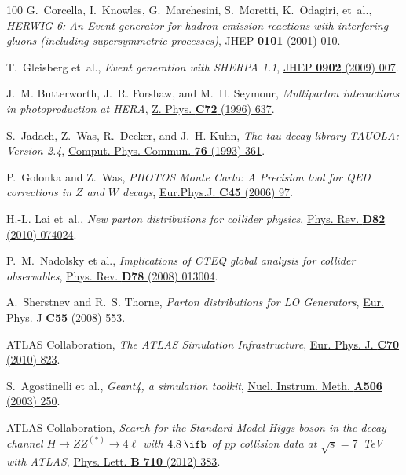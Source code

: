 \documentclass[final,3p,times,twocolumn]{elsarticle}
\begin{document}
\begin{thebibliography}{100}
G.~Corcella, I.~Knowles, G.~Marchesini, S.~Moretti, K.~Odagiri, {et~al.}, {\em
  {HERWIG 6: An Event generator for hadron emission reactions with interfering
  gluons (including supersymmetric processes)}},
  \href{http://dx.doi.org/10.1088/1126-6708/2001/01/010}{JHEP {\bfseries 0101}
  (2001) 010}.

T.~Gleisberg {et~al.}, {\em Event generation with SHERPA 1.1},
  \href{http://dx.doi.org/10.1088/1126-6708/2009/02/007}{JHEP {\bfseries 0902}
  (2009) 007}.

J.~M. Butterworth, J.~R. Forshaw, and M.~H. Seymour, {\em {Multiparton
  interactions in photoproduction at HERA}},
  \href{http://dx.doi.org/10.1007/s002880050286}{Z. Phys. {\bfseries C72}
  (1996) 637}.

S.~Jadach, Z.~Was, R.~Decker, and J.~H. Kuhn, {\em {The tau decay library
  TAUOLA: Version 2.4}},
  \href{http://dx.doi.org/10.1016/0010-4655(93)90061-G}{Comput. Phys. Commun.
  {\bfseries 76} (1993) 361}.

P.~Golonka and Z.~Was, {\em {PHOTOS Monte Carlo: A Precision tool for QED
  corrections in $Z$ and $W$ decays}},
  \href{http://dx.doi.org/10.1140/epjc/s2005-02396-4}{Eur.Phys.J. {\bfseries
  C45} (2006) 97}.

H.-L. Lai {et~al.}, {\em New parton distributions for collider physics},
  \href{http://dx.doi.org/10.1103/PhysRevD.82.074024}{Phys. Rev. {\bfseries
  D82} (2010) 074024}.

{P.~M.~Nadolsky et al.}, {\em {Implications of CTEQ global analysis for
  collider observables}},
  \href{http://dx.doi.org/10.1103/PhysRevD.78.013004}{Phys. Rev. {\bfseries
  D78} (2008) 013004}.

A.~Sherstnev and R.~S. Thorne, {\em {Parton distributions for LO Generators}},
  \href{http://dx.doi.org/10.1140/epjc/s10052-008-0610-x}{Eur. Phys. J
  {\bfseries C55} (2008) 553}.

{ATLAS Collaboration}, {\em {The ATLAS Simulation Infrastructure}},
  \href{http://dx.doi.org/10.1140/epjc/s10052-010-1429-9}{Eur. Phys. J.
  {\bfseries C70} (2010) 823}.

{S.~Agostinelli et al.}, {\em {\sc Geant4}, a simulation toolkit},
  \href{http://dx.doi.org/10.1016/S0168-9002(03)01368-8}{Nucl. Instrum. Meth.
  {\bfseries A506} (2003) 250}.

{ATLAS Collaboration}, {\em {Search for the Standard Model Higgs boson in the
  decay channel $H\rightarrow ZZ^{(*)}\rightarrow 4\ell$ with $4.8\:\ifb$ of
  $pp$ collision data at $\sqrt{s} = 7$~TeV with ATLAS}},
  \href{http://dx.doi.org/10.1016/j.physletb.2012.03.005}{Phys. Lett.
  {\bfseries B 710} (2012) 383}.


\end{thebibliography}
\end{document}
